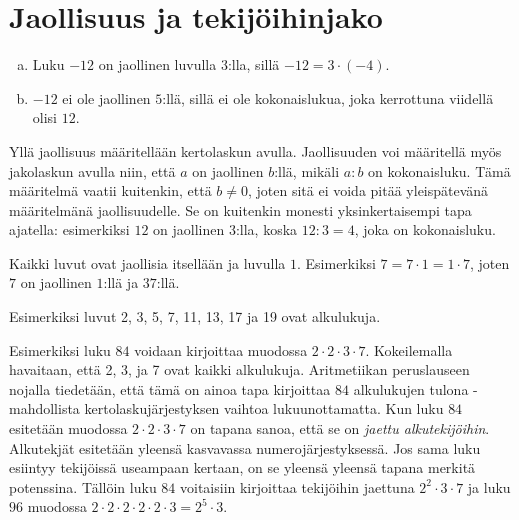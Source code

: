 \section{Jaollisuus ja tekijöihinjako}


\begin{esimerkki}
\begin{enumerate}[a)]
\item Luku $-12$ on jaollinen luvulla $3$:lla, sillä $-12 = 3 \cdot (-4)$.
\item $-12$ ei ole jaollinen $5$:llä, sillä ei ole kokonaislukua, joka kerrottuna viidellä olisi $12$.
\end{enumerate}
\end{esimerkki}

Yllä jaollisuus määritellään kertolaskun avulla. Jaollisuuden voi määritellä
myös jakolaskun avulla niin, että $a$ on jaollinen $b$:llä, mikäli $a:b$ on
kokonaisluku. Tämä määritelmä vaatii kuitenkin, että $b \neq 0$, joten
sitä ei voida pitää yleispätevänä määritelmänä jaollisuudelle. Se on
kuitenkin monesti yksinkertaisempi tapa ajatella: esimerkiksi $12$ on
jaollinen $3$:lla, koska $12:3 = 4$, joka on kokonaisluku.


Kaikki luvut ovat jaollisia itsellään ja luvulla $1$. Esimerkiksi $7=7 \cdot 1=1 \cdot 7$, joten $7$ on jaollinen $1$:llä ja $37$:llä.


Esimerkiksi luvut 2, 3, 5, 7, 11, 13, 17 ja 19 ovat alkulukuja. 


Esimerkiksi luku $84$ voidaan kirjoittaa muodossa $2\cdot 2\cdot 3\cdot 7$. Kokeilemalla havaitaan, että 2, 3, ja 7 ovat kaikki alkulukuja. Aritmetiikan peruslauseen nojalla tiedetään, että tämä on ainoa tapa kirjoittaa $84$ alkulukujen tulona - mahdollista kertolaskujärjestyksen vaihtoa lukuunottamatta. Kun luku $84$ esitetään muodossa $2\cdot 2\cdot 3\cdot 7$ on tapana sanoa, että se on \emph{jaettu alkutekijöihin}. Alkutekjät esitetään yleensä kasvavassa numerojärjestyksessä. Jos sama luku esiintyy tekijöissä useampaan kertaan, on se yleensä yleensä tapana merkitä potenssina. Tällöin luku $84$ voitaisiin kirjoittaa tekijöihin jaettuna $2^2\cdot 3\cdot 7$ ja luku $96$ muodossa $2\cdot 2\cdot 2\cdot 2\cdot 2\cdot 3=2^5\cdot 3$.

